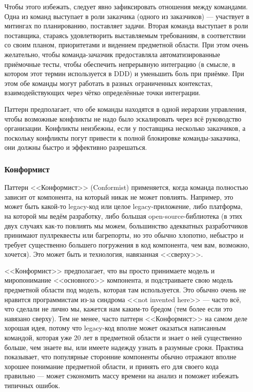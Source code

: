 \documentclass{../../text-style}
\begin{document}
Чтобы этого избежать, следует явно зафиксировать отношения между командами. Одна из команд выступает в роли заказчика (одного из заказчиков) --- участвует в митингах по планированию, поставляет задачи. Вторая команда выступает в роли поставщика, стараясь удовлетворить выставляемым требованиям, в соответствии со своим планом, приоритетами и видением предметной области. При этом очень желательно, чтобы команда-зачазчик предоставляла автоматизированные приёмочные тесты, чтобы обеспечить непрерывную интеграцию (в смысле, в котором этот термин используется в DDD) и уменьшить боль при приёмке. При этом обе команды могут работать в разных ограниченных контекстах, взаимодействующих через чётко определённые точки интеграции.

Паттерн предполагает, что обе команды находятся в одной иерархии управления, чтобы возможные конфликты не надо было эскалировать через всё руководство организации. Конфликты неизбежны, если у поставщика несколько заказчиков, а поскольку конфликты погут привести к полной блокировке команды-заказчика, они должны быстро и эффективно разрешаться.

\subsubsection{Конформист}

Паттерн <<Конформист>> (Conformist) применяется, когда команда полностью зависит от компонента, на который никак не может повлиять. Например, это может быть какой-то legacy-код или целое legacy-приложение, либо платформа, на которой мы ведём разработку, либо большая open-source-библиотека (в этих двух случаях как-то повлиять мы можем, большинство адекватных разработчиков принимают пуллреквесты или багрепорты, но это обычно хлопотно, небыстро и требует существенно большего погружения в код компонента, чем вам, возможно, хочется). Это может быть и технология, навязанная <<сверху>>.

<<Конформист>> предполагает, что вы просто принимаете модель и миропонимание <<основного>> компонента, и подстраиваете свою модель предметной области под модель, которая там используется. Это обычно очень не нравится программистам из-за синдрома <<not invented here>> --- часто всё, что сделали не лично мы, кажется нам каким-то бредом (тем более если это навязано сверху). Тем не менее, часто паттерн <<Конформист>> на самом деле хорошая идея, потому что legacy-код вполне может оказаться написанным командой, которая уже 20 лет в предметной области и знает о ней существенно больше, чем знаете вы, или имеете надежду узнать в разумные сроки. Практика показывает, что популярные сторонние компоненты обычно отражают вполне хорошее понимание предметной области, и принять его для своего кода правильно --- может сэкономить массу времени на анализ и поможет избежать типичных ошибок.
\end{document}
